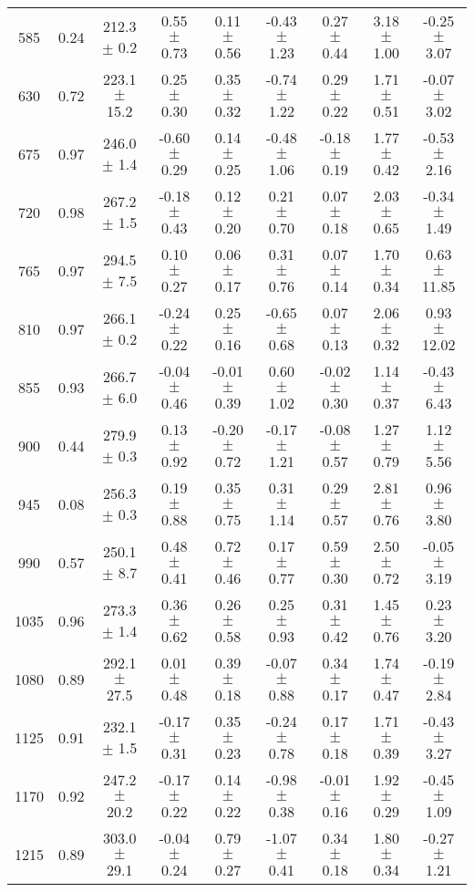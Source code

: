 \documentclass[twocolumn]{aastex61}%
\begin{document}
\begin{table*}[ht]
\begin{tabular}{ccc|ccccc|c}
585 & 0.24 & 212.3 $\pm$ 0.2 & 0.55 $\pm$ 0.73 & 0.11 $\pm$ 0.56 & -0.43 $\pm$ 1.23 & 0.27 $\pm$ 0.44 & 3.18 $\pm$ 1.00 & -0.25 $\pm$ 3.07\\
630 & 0.72 & 223.1 $\pm$ 15.2 & 0.25 $\pm$ 0.30 & 0.35 $\pm$ 0.32 & -0.74 $\pm$ 1.22 & 0.29 $\pm$ 0.22 & 1.71 $\pm$ 0.51 & -0.07 $\pm$ 3.02\\
675 & 0.97 & 246.0 $\pm$ 1.4 & -0.60 $\pm$ 0.29 & 0.14 $\pm$ 0.25 & -0.48 $\pm$ 1.06 & -0.18 $\pm$ 0.19 & 1.77 $\pm$ 0.42 & -0.53 $\pm$ 2.16\\
720 & 0.98 & 267.2 $\pm$ 1.5 & -0.18 $\pm$ 0.43 & 0.12 $\pm$ 0.20 & 0.21 $\pm$ 0.70 & 0.07 $\pm$ 0.18 & 2.03 $\pm$ 0.65 & -0.34 $\pm$ 1.49\\
765 & 0.97 & 294.5 $\pm$ 7.5 & 0.10 $\pm$ 0.27 & 0.06 $\pm$ 0.17 & 0.31 $\pm$ 0.76 & 0.07 $\pm$ 0.14 & 1.70 $\pm$ 0.34 & 0.63 $\pm$ 11.85\\
810 & 0.97 & 266.1 $\pm$ 0.2 & -0.24 $\pm$ 0.22 & 0.25 $\pm$ 0.16 & -0.65 $\pm$ 0.68 & 0.07 $\pm$ 0.13 & 2.06 $\pm$ 0.32 & 0.93 $\pm$ 12.02\\
855 & 0.93 & 266.7 $\pm$ 6.0 & -0.04 $\pm$ 0.46 & -0.01 $\pm$ 0.39 & 0.60 $\pm$ 1.02 & -0.02 $\pm$ 0.30 & 1.14 $\pm$ 0.37 & -0.43 $\pm$ 6.43\\
900 & 0.44 & 279.9 $\pm$ 0.3 & 0.13 $\pm$ 0.92 & -0.20 $\pm$ 0.72 & -0.17 $\pm$ 1.21 & -0.08 $\pm$ 0.57 & 1.27 $\pm$ 0.79 & 1.12 $\pm$ 5.56\\
945 & 0.08 & 256.3 $\pm$ 0.3 & 0.19 $\pm$ 0.88 & 0.35 $\pm$ 0.75 & 0.31 $\pm$ 1.14 & 0.29 $\pm$ 0.57 & 2.81 $\pm$ 0.76 & 0.96 $\pm$ 3.80\\
990 & 0.57 & 250.1 $\pm$ 8.7 & 0.48 $\pm$ 0.41 & 0.72 $\pm$ 0.46 & 0.17 $\pm$ 0.77 & 0.59 $\pm$ 0.30 & 2.50 $\pm$ 0.72 & -0.05 $\pm$ 3.19\\
1035 & 0.96 & 273.3 $\pm$ 1.4 & 0.36 $\pm$ 0.62 & 0.26 $\pm$ 0.58 & 0.25 $\pm$ 0.93 & 0.31 $\pm$ 0.42 & 1.45 $\pm$ 0.76 & 0.23 $\pm$ 3.20\\
1080 & 0.89 & 292.1 $\pm$ 27.5 & 0.01 $\pm$ 0.48 & 0.39 $\pm$ 0.18 & -0.07 $\pm$ 0.88 & 0.34 $\pm$ 0.17 & 1.74 $\pm$ 0.47 & -0.19 $\pm$ 2.84\\
1125 & 0.91 & 232.1 $\pm$ 1.5 & -0.17 $\pm$ 0.31 & 0.35 $\pm$ 0.23 & -0.24 $\pm$ 0.78 & 0.17 $\pm$ 0.18 & 1.71 $\pm$ 0.39 & -0.43 $\pm$ 3.27\\
1170 & 0.92 & 247.2 $\pm$ 20.2 & -0.17 $\pm$ 0.22 & 0.14 $\pm$ 0.22 & -0.98 $\pm$ 0.38 & -0.01 $\pm$ 0.16 & 1.92 $\pm$ 0.29 & -0.45 $\pm$ 1.09\\
1215 & 0.89 & 303.0 $\pm$ 29.1 & -0.04 $\pm$ 0.24 & 0.79 $\pm$ 0.27 & -1.07 $\pm$ 0.41 & 0.34 $\pm$ 0.18 & 1.80 $\pm$ 0.34 & -0.27 $\pm$ 1.21\\

\end{tabular}
\end{table*}
\end{document}
